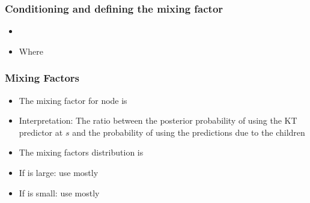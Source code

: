 \documentclass{beamer}
\begin{document}
\begin{frame}
  \frametitle{Conditioning and defining the mixing factor}
  \begin{small}
  \begin{itemize}
  \item {}
\item Where 
\end{itemize}
\end{small}

\end{frame}

\begin{frame}
\frametitle{Mixing Factors}
\begin{itemize}
\item The mixing factor for node  is
\item Interpretation: The ratio between the posterior probability of
  using the KT predictor at $s$  and the probability of using the predictions due to the children 
\item The mixing factors  distribution is 
\item If  is large: use mostly 
\item If  is small: use mostly 
\end{itemize}
\end{frame}
\end{document}
